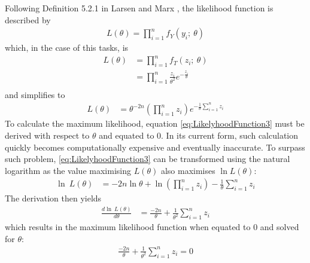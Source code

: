 Following Definition 5.2.1 in Larsen and Marx \cite{larsen2005introduction}, the likelihood function is described by
\begin{equation}
\begin{split}
L(\theta) = \prod_{i=1}^n f_Y(y_i;~\theta)
\end{split}
\label{eq:LikelyhoodFunctionDefinition}
\end{equation}
which, in the case of this tasks, is 
\begin{equation}
\begin{split}
L(\theta) 
&= \prod_{i=1}^n f_T(z_i;~\theta)\\
&= \prod_{i=1}^n \frac{z_i}{\theta^2} e^{-\frac{z_i}{\theta}}\\
\end{split}
\label{eq:LikelyhoodFunction2}
\end{equation}
and simplifies to 
\begin{equation}
\begin{split}
L(\theta) 
&= \theta^{-2n}\left(\prod_{i=1}^n z_i\right)e^{-\frac{1}{\theta}\sum_{i=1}^n z_i}
\end{split}
\label{eq:LikelyhoodFunction3}
\end{equation}
To calculate the maximum likelihood, equation \eqref{eq:LikelyhoodFunction3} must be derived with respect to $\theta$ and equated to $0$. In its current form, such calculation quickly becomes computationally expensive and eventually inaccurate. To surpass such problem, \eqref{eq:LikelyhoodFunction3} can be transformed using the natural logarithm as the value maximising $L(\theta)$ also maximises $\ln L(\theta)$:
\begin{equation}
\begin{split}
\ln~L(\theta) 
&= -2n\ln\theta + \ln\left(\prod_{i=1}^n z_i\right)-\frac{1}{\theta}\sum_{i=1}^n z_i
\end{split}
\label{eq:LikelyhoodFunction4}
\end{equation}
The derivation then yields
\begin{equation}
\begin{split}
\frac{d\ln~L(\theta)}{d\theta}
&= \frac{-2n}{\theta}+\frac{1}{\theta^2}\sum_{i=1}^n z_i
\end{split}
\label{eq:LikelyhoodFunction5}
\end{equation}
which results in the maximum likelihood function when equated to $0$ and solved for $\theta$:
\begin{equation}
\begin{split}
\frac{-2n}{\theta}+\frac{1}{\theta^2}\sum_{i=1}^n z_i = 0
\end{split}
\label{eq:LikelyhoodFunction6}
\end{equation}
